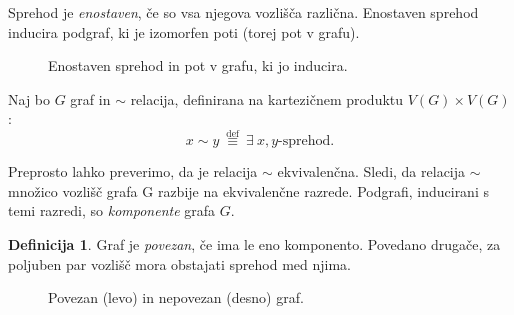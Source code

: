 \documentclass[12pt,a4paper]{amsart}
\theoremstyle{definition} %
\newtheorem{definicija}{Definicija}[section]
\theoremstyle{plain} %
\newcommand{\N}{\mathbb N}
\newcommand{\vozlisca}[1][G]{\ensuremath{V(#1)}}
\begin{document}
Sprehod je \emph{enostaven}, če so vsa njegova vozlišča različna. Enostaven sprehod inducira podgraf, ki je izomorfen poti (torej pot v grafu).

\begin{figure}[h]
    \caption{Enostaven sprehod in pot v grafu, ki jo inducira.}
\end{figure}

Naj bo $G$ graf in $\sim$ relacija, definirana na kartezičnem produktu $\vozlisca \times \vozlisca$:
\[ x \sim y \ \stackrel{\text{def}}{\equiv} \ \exists \ x,y \text{-sprehod.} \]

Preprosto lahko preverimo, da je relacija $\sim$ ekvivalenčna. Sledi, da relacija $\sim$ množico vozlišč grafa G razbije na ekvivalenčne razrede. Podgrafi, inducirani s temi razredi, so \emph{komponente} grafa $G$.

\begin{definicija}
	Graf je \emph{povezan}, če ima le eno komponento. Povedano drugače, za poljuben par vozlišč mora obstajati sprehod med njima.
\end{definicija}

\begin{figure}[h]
    \caption{Povezan (levo) in nepovezan (desno) graf.}
\end{figure}
\end{document}
